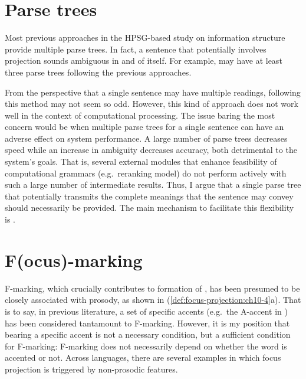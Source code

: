 \section{Parse trees}
\label{10:sec:parse-trees}

Most previous approaches in the HPSG-based study on
information structure provide multiple parse trees. In fact,
a sentence that potentially involves  projection sounds ambiguous
in and of itself. For example,  may have at
least three parse trees following the previous approaches.



\noindent From the perspective that a single sentence may have
multiple readings, following this method may not seem so odd. However,
this kind of approach does not work well in the context of
computational processing.  The issue baring the most concern would be
when multiple parse trees for a single sentence can have an adverse
effect on system performance.  A large number of parse trees decreases
speed while an increase in ambiguity decreases accuracy, both
detrimental to the system's goals. That is, several external modules
that enhance feasibility of computational grammars (e.g.\ reranking
model) do not perform actively with such a large number of
intermediate results. Thus, I argue that a single parse tree that
potentially transmits the complete meanings that the sentence may
convey should necessarily be provided.  The main mechanism to
facilitate this flexibility is .


\section{F(ocus)-marking}
\label{10:sec:f-marking}


F-marking, which crucially contributes to formation of , 
has been presumed to be closely associated with
prosody, as shown in
(\ref{def:focus-projection:ch10-4}a). That is to say, in previous
literature, a set of specific accents (e.g.\ the A-accent in
) has been considered tantamount to F-marking.
However, it is my position that bearing a specific accent is not a
necessary condition, but a sufficient condition for F-marking:
F-marking does not necessarily depend on whether the word is accented
or not. Across languages, there are several examples in which focus
projection is triggered by non-prosodic features.


